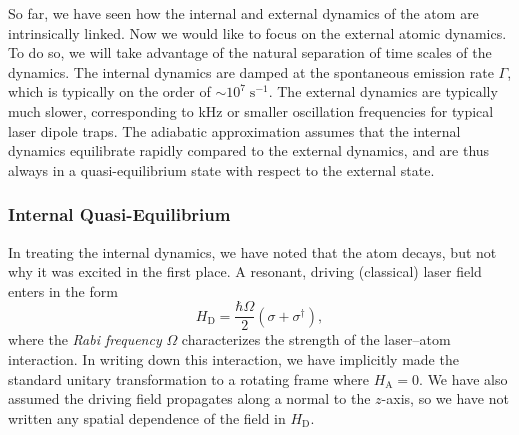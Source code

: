 \documentclass[aps,twocolumn,superscriptaddress,footinbib,floatfix,showpacs]{revtex4}
\def\HA{H_\mathrm{\scriptscriptstyle A}}
\def\HD{H_\mathrm{\scriptscriptstyle D}}
\begin{document}
So far, we have seen how the internal and external dynamics of the
atom are intrinsically linked.  Now we would like to focus on the
external atomic dynamics.
To do so, we will take advantage of the natural separation of time
scales of the dynamics.  The internal dynamics are damped at
the spontaneous emission rate $\Gamma$, which is typically on the
order of $\sim\!\! 10^7\;\mathrm{s}^{-1}$.  The external
dynamics are typically much slower, corresponding to kHz or smaller
oscillation frequencies for typical laser dipole traps.
The adiabatic approximation assumes that the internal dynamics
equilibrate rapidly compared to the external dynamics,
and are thus always in a quasi-equilibrium state with respect to the
external state.


\subsubsection{Internal Quasi-Equilibrium}\label{section:quasiequilibrium}

In treating the internal dynamics, we have noted that the 
atom decays, but not why it was excited in the first place.
A resonant, driving (classical) laser field enters in the form 
\cite{Loudon83}
\begin{equation}
  \HD = \frac{\hbar\Omega}{2}\left(\sigma+\sigma^\dagger\right),
  \label{drivingHam}
\end{equation}
where the \textit{Rabi frequency} $\Omega$ characterizes the 
strength of the laser--atom interaction.
In writing down this interaction, we have implicitly made the
standard unitary transformation to a rotating frame where
$\HA=0$.
We have also assumed the driving field propagates along a normal to the
$z$-axis, so we have not written any spatial dependence of the field
in $\HD$.
\end{document}
